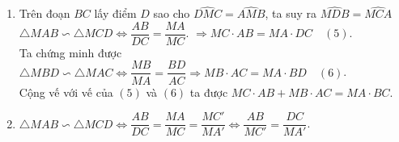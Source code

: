 \begin{bt}
{\begin{enumerate}
\begin{enumerate}[1)]
				Mặt khác ta chứng minh được $\widehat{AHB} + \widehat{ACB} = 180^\circ$.\\
				Từ đó suy ra $\widehat{ANB} + \widehat{AHB} = 180^\circ \Rightarrow $ tứ giác $NAHB$ nội tiếp được một đường tròn.
				\item Chứng minh tương tự ý $1$ ta suy ra tứ giác $AHCE$ nội tiếp được một đường tròn.\\
				Ta có $\widehat{NHE} = \widehat{NHB} + \widehat{CHE} + \widehat{BHC} = \widehat{BAM} + \widehat{CAM} + \widehat{BHC} = \widehat{BAC} + + \widehat{BHC} = 180^\circ$. Suy ra  $\widehat{NHE} = 180^\circ$.\\
				Suy ra ba điểm $N, H, E$ thẳng hàng.
				\item Theo tính chất đối xứng ta có $AM = AN = AE$ nên $\triangle AEN$ cân tại $A$, mà $AK \perp NE$ nên đường cao $AK$ cũng là tia phân giác của góc $\widehat{NAE}$ nên $\widehat{NAK} = \dfrac{1}{2}\widehat{NAE} \quad(3)$. \\
				Mà $\widehat{BAC} = \widehat{BAM} + \widehat{MAC} = \dfrac{1}{2}\widehat{NAM} + \dfrac{1}{2}\widehat{MAE} =  \dfrac{1}{2}\widehat{NAE} \quad (4)$.\\
				Từ $(3)$ và $(4)$ suy ra $\widehat{BAC} = \widehat{NAK}$.
				\item Áp dụng hệ thức về cạnh và góc trong tam giác $ANK$ ta suy ra $NE = 2AM\cdot \sin{BAC}$; mà $ AM \leq 2R$. Suy ra  $NE \leq 4R\sin{BAC}$. \\
				Vậy $NE$ có giá trị lớn nhất bằng $4R\sin{BAC} \Leftrightarrow M$ đối xứng với $A$ qua điểm $O$.
			\end{enumerate}
			\item Trên đoạn $BC$ lấy điểm $D$ sao cho $\widehat{DMC} = \widehat{AMB}$, ta suy ra $\widehat{MDB} = \widehat{MCA}$ \\
			$\triangle MAB \backsim \triangle MCD \Leftrightarrow \dfrac{AB}{DC} = \dfrac{MA}{MC}$. $\Rightarrow MC\cdot AB = MA \cdot DC \quad (5)$.\\
			Ta chứng minh được $\triangle MBD \backsim \triangle MAC \Leftrightarrow \dfrac{MB}{MA} = \dfrac{BD}{AC} \Rightarrow MB \cdot AC = MA \cdot BD \quad (6)$.\\
			Cộng vế với vế của $(5)$ và $(6)$ ta được $MC\cdot AB + MB\cdot AC = MA\cdot BC$. 
			\item $\triangle MAB \backsim \triangle MCD \Leftrightarrow \dfrac{AB}{DC} = \dfrac{MA}{MC} = \dfrac{MC'}{MA'}\Leftrightarrow \dfrac{AB}{MC'} = \dfrac{DC}{MA'}$.\\
			

\end{enumerate}}
\end{bt}
